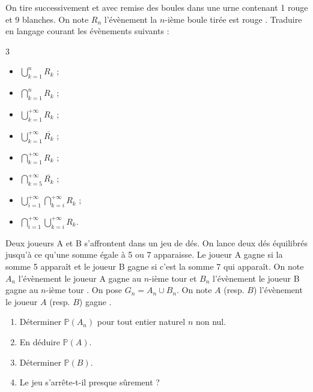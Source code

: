 \documentclass[../PolyS4.tex]{subfiles}
\begin{document}

On tire successivement et avec remise des boules dans une urne contenant 1 rouge et 9 blanches. On note $R_n$ l'évènement \og  la $n$-ième boule tirée est rouge \fg{} . Traduire en langage courant les évènements suivants :\\
\begin{multicols}{3}
\begin{itemize}
    \item $\bigcup_{k=1}^{n} R_k$ ;
    \item $\bigcap_{k=1}^{n} R_k$ ;
    \item $\bigcup_{k=1}^{+\infty} R_k$ ;
    \item $\bigcup_{k=1}^{+\infty} \overline{R_k}$ ;
    \item $\bigcap_{k=1}^{+\infty} R_k$ ;
    \item $\bigcap_{k=5}^{+\infty} \overline{R_k}$ ;
    \item $\bigcup_{i=1}^{+\infty} \bigcap_{k=i}^{+\infty} R_k$ ;
    \item $\bigcap_{i=1}^{+\infty} \bigcup_{k=i}^{+\infty} R_k$.\\
\end{itemize}
\end{multicols}


\newpage



Deux joueurs A et B s'affrontent dans un jeu de dés. On lance deux dés équilibrés jusqu'à ce qu'une somme égale à 5 ou 7 apparaisse. Le joueur A gagne si la somme 5 apparaît et le joueur B gagne si c'est la somme 7 qui apparaît. On note $A_n$ l'évènement \og  le joueur A gagne au $n$-ième tour \fg{}  et $B_n$ l'évènement \og  le joueur B gagne au $n$-ième tour \fg{} . On pose $G_n = A_n \cup B_n$. On note $A$ (resp. $B$) l'évènement \og  le joueur $A$ (resp. $B$) gagne \fg{} .
\begin{enumerate}
    \item Déterminer $\mathbb{P}(A_n)$ pour tout entier naturel $n$ non nul.
    \item En déduire $\mathbb{P}(A)$.
    \item Déterminer $\mathbb{P}(B)$.
    \item Le jeu s'arrête-t-il presque sûrement ?\\
\end{enumerate}



\end{document}
